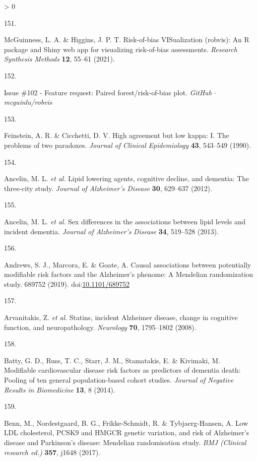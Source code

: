 \documentclass[a4paper, twoside]{templates/ociamthesis}
\newlength{\cslhangindent}
\newlength{\csllabelwidth}
\newenvironment{CSLReferences}[3] %
 {%
  \setlength{\parindent}{0pt}
  \ifodd #1 \everypar{\setlength{\hangindent}{\cslhangindent}}\ignorespaces\fi
  \ifnum #2 > 0
  \setlength{\parskip}{#2\baselineskip}
  \fi
 }%
 {}
\newcommand{\CSLLeftMargin}[1]{\parbox[t]{\maxof{\widthof{#1}}{\csllabelwidth}}{#1}}
\newcommand{\CSLRightInline}[1]{\parbox[t]{\linewidth - \csllabelwidth}{#1}}
\begin{document}
\begin{CSLReferences}{0}{0}
\leavevmode\hypertarget{ref-mcguinness2020robvisPaper}{}%
\CSLLeftMargin{151. }
\CSLRightInline{McGuinness, L. A. \& Higgins, J. P. T. Risk-of-bias {VISualization} (robvis): {An R} package and {Shiny} web app for visualizing risk-of-bias assessments. \emph{Research Synthesis Methods} \textbf{12}, 55--61 (2021).}

\leavevmode\hypertarget{ref-zotero-14999}{}%
\CSLLeftMargin{152. }
\CSLRightInline{Issue \#102 - {Feature} request: Paired forest/risk-of-bias plot. \emph{GitHub {\(\cdot\)} mcguinlu/robvis}}

\leavevmode\hypertarget{ref-feinstein1990}{}%
\CSLLeftMargin{153. }
\CSLRightInline{Feinstein, A. R. \& Cicchetti, D. V. High agreement but low kappa: {I}. {The} problems of two paradoxes. \emph{Journal of Clinical Epidemiology} \textbf{43}, 543--549 (1990).}

\leavevmode\hypertarget{ref-ancelin2012a}{}%
\CSLLeftMargin{154. }
\CSLRightInline{Ancelin, M. L. \emph{et al.} Lipid lowering agents, cognitive decline, and dementia: The three-city study. \emph{Journal of Alzheimer's Disease} \textbf{30}, 629--637 (2012).}

\leavevmode\hypertarget{ref-ancelin2013}{}%
\CSLLeftMargin{155. }
\CSLRightInline{Ancelin, M. L. \emph{et al.} Sex differences in the associations between lipid levels and incident dementia. \emph{Journal of Alzheimer's Disease} \textbf{34}, 519--528 (2013).}

\leavevmode\hypertarget{ref-andrews2019a}{}%
\CSLLeftMargin{156. }
\CSLRightInline{Andrews, S. J., Marcora, E. \& Goate, A. Causal associations between potentially modifiable risk factors and the {Alzheimer}'s phenome: {A Mendelian} randomization study. 689752 (2019). doi:\href{https://doi.org/10.1101/689752}{10.1101/689752}}

\leavevmode\hypertarget{ref-arvanitakis2008}{}%
\CSLLeftMargin{157. }
\CSLRightInline{Arvanitakis, Z. \emph{et al.} Statins, incident {Alzheimer} disease, change in cognitive function, and neuropathology. \emph{Neurology} \textbf{70}, 1795--1802 (2008).}

\leavevmode\hypertarget{ref-batty2014}{}%
\CSLLeftMargin{158. }
\CSLRightInline{Batty, G. D., Russ, T. C., Starr, J. M., Stamatakis, E. \& Kivimaki, M. Modifiable cardiovascular disease risk factors as predictors of dementia death: Pooling of ten general population-based cohort studies. \emph{Journal of Negative Results in Biomedicine} \textbf{13}, 8 (2014).}

\leavevmode\hypertarget{ref-benn2017b}{}%
\CSLLeftMargin{159. }
\CSLRightInline{Benn, M., Nordestgaard, B. G., Frikke-Schmidt, R. \& Tybjaerg-Hansen, A. Low {LDL} cholesterol, {PCSK9} and {HMGCR} genetic variation, and risk of {Alzheimer}'s disease and {Parkinson}'s disease: {Mendelian} randomisation study. \emph{BMJ (Clinical research ed.)} \textbf{357}, j1648 (2017).}


\end{CSLReferences}
\end{document}
